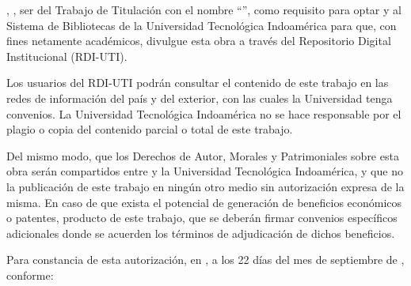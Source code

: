 
\UTIAutoresPronombre, \UTIAutoresTexto, \UTIVerboDeclaro{} ser \UTIAutorEtiquetaMin{} del Trabajo de Titulación con el nombre ``\UTITituloProyecto'', como requisito para optar \UTIFraseOptarTituloProfesional{} y \UTIVerboAutorizo{} al Sistema de Bibliotecas de la Universidad Tecnológica Indoamérica para que, con fines netamente académicos, divulgue esta obra a través del Repositorio Digital Institucional (RDI-UTI).

Los usuarios del RDI-UTI podrán consultar el contenido de este trabajo en las redes de información del país y del exterior, con las cuales la Universidad tenga convenios. La Universidad Tecnológica Indoamérica no se hace responsable por el plagio o copia del contenido parcial o total de este trabajo.
	        
Del mismo modo, \UTIVerboAcepto{} que los Derechos de Autor, Morales y Patrimoniales sobre esta obra serán compartidos entre \UTIAutoresPoseedor{} y la Universidad Tecnológica Indoamérica, y que no \UTIVerboTramito{} la publicación de este trabajo en ningún otro medio sin autorización expresa de la misma. En caso de que exista el potencial de generación de beneficios económicos o patentes, producto de este trabajo, \UTIVerboAcepto{} que se deberán firmar convenios específicos adicionales donde se acuerden los términos de adjudicación de dichos beneficios.

Para constancia de esta autorización, en \UTICiudadPais, a los 22 días del mes de septiembre de \UTIAnio, \UTIVerboFirmo{} conforme:

\vspace{0.2cm}

\UTIRepositorioAutoresBloque